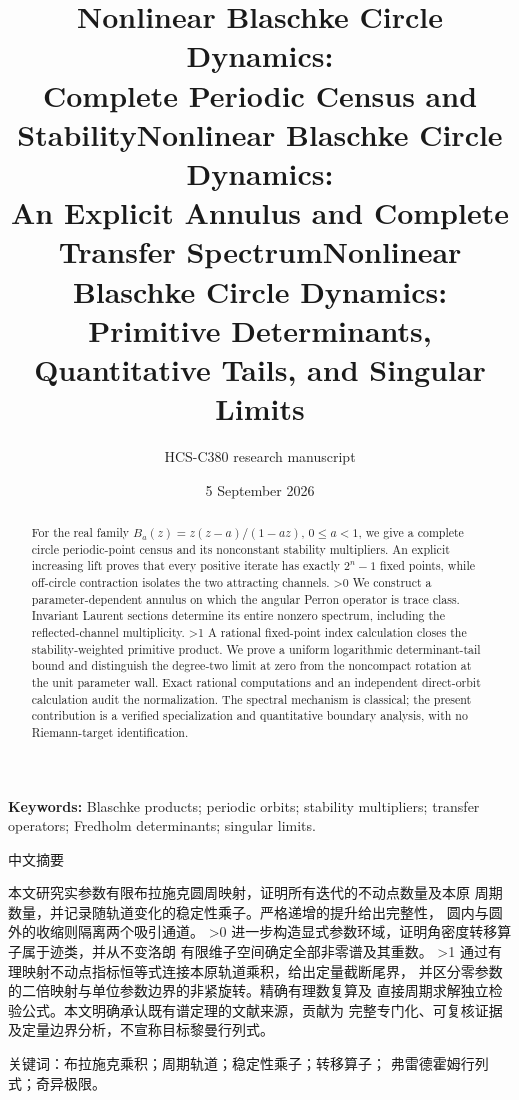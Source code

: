 \documentclass[10pt]{article}
\title{Nonlinear Blaschke Circle Dynamics:\\Complete Periodic Census and Stability}
\title{Nonlinear Blaschke Circle Dynamics:\\An Explicit Annulus and Complete Transfer Spectrum}
\title{Nonlinear Blaschke Circle Dynamics:\\Primitive Determinants, Quantitative Tails, and Singular Limits}
\author{HCS-C380 research manuscript}
\date{5 September 2026}
\begin{document}
\maketitle
\begin{abstract}
For the real family $B_a(z)=z(z-a)/(1-az)$, $0\leq a<1$, we give a
complete circle periodic-point census and its nonconstant stability
multipliers. An explicit increasing lift proves that every positive iterate
has exactly $2^n-1$ fixed points, while off-circle contraction isolates the
two attracting channels.
\ifnum\CRevisionRound>0
We construct a parameter-dependent annulus on which the angular Perron
operator is trace class. Invariant Laurent sections determine its entire
nonzero spectrum, including the reflected-channel multiplicity.
\fi
\ifnum\CRevisionRound>1
A rational fixed-point index calculation closes the stability-weighted
primitive product. We prove a uniform logarithmic determinant-tail bound
and distinguish the degree-two limit at zero from the noncompact rotation
at the unit parameter wall. Exact rational computations and an independent
direct-orbit calculation audit the normalization. The spectral mechanism
is classical; the present contribution is a verified specialization and
quantitative boundary analysis, with no Riemann-target identification.
\fi
\end{abstract}
\noindent\textbf{Keywords:} Blaschke products; periodic orbits; stability
multipliers; transfer operators; Fredholm determinants; singular limits.
\begin{otherlanguage}{chinese-simplified}
\begin{center}\large 中文摘要\end{center}
\begin{sloppypar}
本文研究实参数有限布拉施克圆周映射，证明所有迭代的不动点数量及本原
周期数量，并记录随轨道变化的稳定性乘子。严格递增的提升给出完整性，
圆内与圆外的收缩则隔离两个吸引通道。
\ifnum\CRevisionRound>0
进一步构造显式参数环域，证明角密度转移算子属于迹类，并从不变洛朗
有限维子空间确定全部非零谱及其重数。
\fi
\ifnum\CRevisionRound>1
通过有理映射不动点指标恒等式连接本原轨道乘积，给出定量截断尾界，
并区分零参数的二倍映射与单位参数边界的非紧旋转。精确有理数复算及
直接周期求解独立检验公式。本文明确承认既有谱定理的文献来源，贡献为
完整专门化、可复核证据及定量边界分析，不宣称目标黎曼行列式。
\fi
\end{sloppypar}
\noindent 关键词：布拉施克乘积；周期轨道；稳定性乘子；转移算子；
弗雷德霍姆行列式；奇异极限。
\end{otherlanguage}
\end{document}
